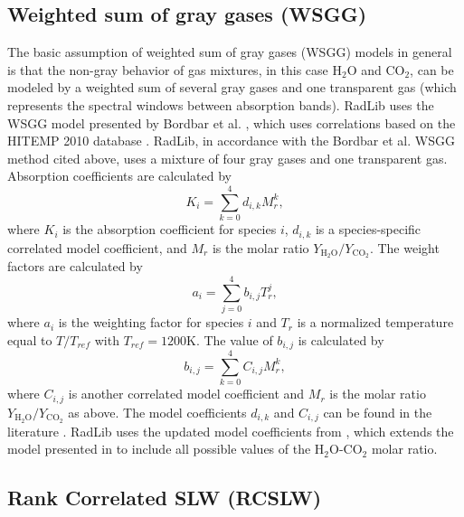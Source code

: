 \documentclass[preprint,12pt, a4paper]{elsarticle}
\begin{document}
\subsection{Weighted sum of gray gases (WSGG)}
\label{s:wsgg}
The basic assumption of weighted sum of gray gases (WSGG) models in general is that the non-gray behavior of gas mixtures, in this case H$_2$O and CO$_2$, can be modeled by a weighted sum of several gray gases and one transparent gas (which represents the spectral windows between absorption bands). 
RadLib uses the WSGG model presented by Bordbar et al. \citep{Bordbar_2014,Bordbar_2020}, which uses correlations based on the HITEMP 2010 database \cite{Rothman_2010}. RadLib, in accordance with the Bordbar et al. WSGG method cited above, uses a mixture of four gray gases and one transparent gas. Absorption coefficients are calculated by 
\begin{equation}
 K_i=\sum_{k=0}^{4}d_{i,k}M_r^k,
\end{equation}
where $K_i$ is the absorption coefficient for species $i$, $d_{i,k}$ is a species-specific correlated model coefficient, and $M_r$ is the molar ratio $Y_{\mathrm{H_2O}}/Y_{\mathrm{CO_2}}$. The weight factors are calculated by 
\begin{equation}
 a_i=\sum_{j=0}^{4}b_{i,j}T_r^j,
\end{equation}
where $a_i$ is the weighting factor for species $i$ and $T_r$ is a normalized temperature equal to $T/T_{ref}$ with $T_{ref}=1200$K. The value of $b_{i,j}$ is calculated by 
\begin{equation}
 b_{i,j}=\sum_{k=0}^{4}C_{i,j}M_r^k,
\end{equation}
where $C_{i,j}$ is another correlated model coefficient and $M_r$ is the molar ratio $Y_{\mathrm{H_2O}}/Y_{\mathrm{CO_2}}$ as above. The model coefficients $d_{i,k}$ and $C_{i,j}$ can be found in the literature \citep{Bordbar_2014,Bordbar_2020}. RadLib uses the updated model coefficients from \citep{Bordbar_2020}, which extends the model presented in \citep{Bordbar_2014} to include all possible values of the H$_2$O-CO$_2$ molar ratio. 

\subsection{Rank Correlated SLW (RCSLW)}
\label{s:RCSLW}
\end{document}
